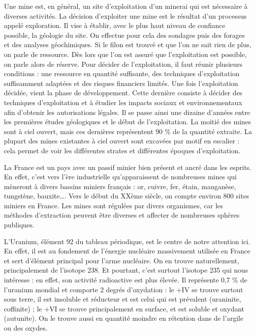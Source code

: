 \documentclass{article}
\begin{document}
Une mine est, en général, un site d’exploitation d’un minerai qui est nécessaire à diverses activités. 
La décision d’exploiter une mine est le résultat d’un processus appelé exploration. Il vise à établir, avec le plus haut niveau de confiance possible, la géologie du site. On effectue pour cela des sondages puis des forages et des analyses géochimiques. Si le filon est trouvé et que l’on ne sait rien de plus, on parle de ressource. Dès lors que l’on est assuré que l’exploitation est possible, on parle alors de réserve. Pour décider de l’exploitation, il faut réunir plusieurs conditions : une ressource en quantité suffisante, des techniques d’exploitation suffisamment adaptées et des risques financiers limités. Une fois l’exploitation décidée, vient la phase de développement. Cette dernière consiste à décider des techniques d’exploitation et à étudier les impacts sociaux et environnementaux afin d’obtenir les autorisations légales. Il se passe ainsi une dizaine d’années entre les premières études géologiques et le début de l’exploitation.
La moitié des mines sont à ciel ouvert, mais ces dernières représentent 90 \% de la quantité extraite. La plupart des mines existantes à ciel ouvert sont excavées par motif en escalier : cela permet de voir les différentes strates et différentes époques d’exploitation.

La France est un pays avec un passif minier bien présent et ancré dans les esprits. En effet, c’est vers l’ère industrielle qu’apparaissent de nombreuses mines qui mèneront à divers bassins miniers français : or, cuivre, fer, étain, manganèse, tungstène, bauxite…. Vers le début du XXème siècle, on compte environ 800 sites miniers en France. Les mines sont régulées par divers organismes, car les méthodes d’extraction peuvent être diverses et affecter de nombreuses sphères publiques.

L’Uranium, élément 92 du tableau périodique, est le centre de notre attention ici. En effet, il est au fondement de l’énergie nucléaire massivement utilisée en France et sert d’élément principal pour l’arme nucléaire. On en trouve naturellement, principalement de l’isotope 238. Et pourtant, c’est surtout l’isotope 235 qui nous intéresse : en effet, son activité radioactive est plus élevée. Il représente 0,7 \% de l’uranium mondial et comporte 2 degrés d’oxydation : le +IV se trouve surtout sous terre, il est insoluble et réducteur et est celui qui est prévalent (uraninite, coffinite) ; le +VI se trouve principalement en surface, et est soluble et oxydant (autunite). On le trouve aussi en quantité moindre en rétention dans de l’argile ou des oxydes.
\end{document}
